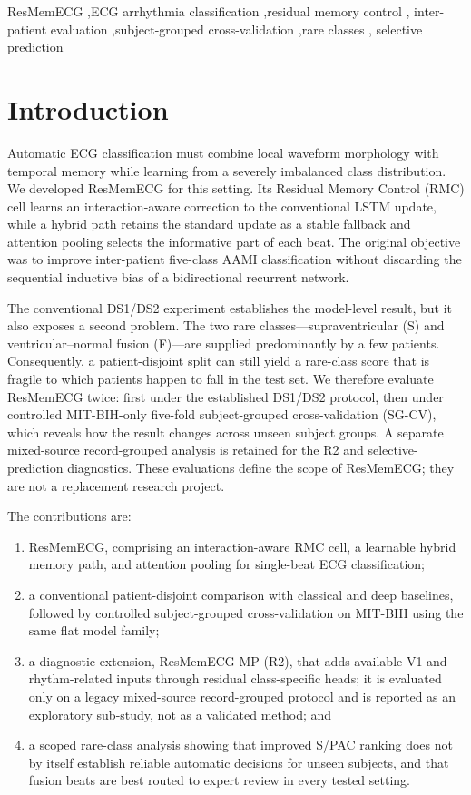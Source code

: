 \documentclass[review,12pt]{elsarticle}
\begin{document}
\begin{frontmatter}
\begin{keyword}
ResMemECG \sep ECG arrhythmia classification \sep residual memory control \sep
inter-patient evaluation \sep subject-grouped cross-validation \sep rare classes \sep
selective prediction
\end{keyword}

\end{frontmatter}
\linenumbers

\section{Introduction}
Automatic ECG classification must combine local waveform morphology with
temporal memory while learning from a severely imbalanced class distribution.
We developed ResMemECG for this setting. Its Residual Memory Control (RMC) cell
learns an interaction-aware correction to the conventional LSTM update, while a
hybrid path retains the standard update as a stable fallback and attention
pooling selects the informative part of each beat. The original objective was
to improve inter-patient five-class AAMI classification without discarding the
sequential inductive bias of a bidirectional recurrent network.

The conventional DS1/DS2 experiment establishes the model-level result, but it
also exposes a second problem. The two rare classes---supraventricular (S) and
ventricular--normal fusion (F)---are supplied predominantly by a few patients.
Consequently, a patient-disjoint split can still yield a rare-class score that
is fragile to which patients happen to fall in the test set. We therefore
evaluate ResMemECG twice: first under
the established DS1/DS2 protocol, then under controlled MIT-BIH-only five-fold
subject-grouped cross-validation (SG-CV), which reveals how the result changes
across unseen subject groups. A separate mixed-source record-grouped analysis
is retained for the R2 and selective-prediction diagnostics. These evaluations
define the scope of ResMemECG; they are not a replacement research project.

The contributions are:
\begin{enumerate}
  \item ResMemECG, comprising an interaction-aware RMC cell, a learnable hybrid
  memory path, and attention pooling for single-beat ECG classification;
  \item a conventional patient-disjoint comparison with classical and deep
  baselines, followed by controlled subject-grouped cross-validation on MIT-BIH
  using the same flat model family;
  \item a diagnostic extension, ResMemECG-MP (R2), that adds available V1 and
  rhythm-related inputs through residual class-specific heads; it is evaluated
  only on a legacy mixed-source record-grouped protocol and is reported as an
  exploratory sub-study, not as a validated method; and
  \item a scoped rare-class analysis showing that improved S/PAC ranking does
  not by itself establish reliable automatic decisions for unseen subjects, and
  that fusion beats are best routed to expert review in every tested setting.
\end{enumerate}
\end{document}
